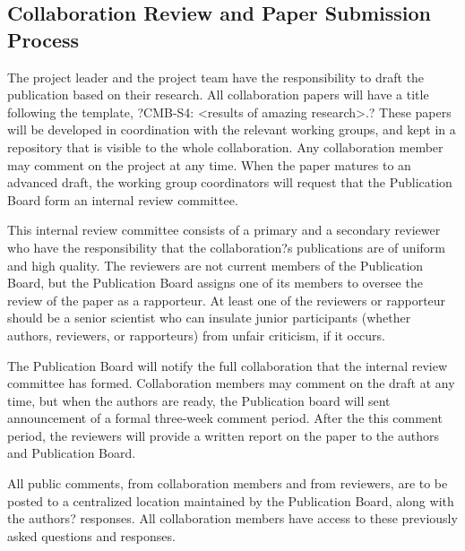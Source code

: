 \subsection{Collaboration Review and Paper Submission Process}
 
The project leader and the project team have the responsibility to draft the publication based on their research.  All collaboration papers will have a title following the template, ?CMB-S4: <results of amazing research>.?  These papers will be developed in coordination with the relevant working groups, and kept in a repository that is visible to the whole collaboration.  Any collaboration member may comment on the project at any time.  When the paper matures to an advanced draft, the working group coordinators will request that the Publication Board form an internal review committee.  

This internal review committee consists of a primary and a secondary reviewer who have the responsibility that the collaboration?s publications are of uniform and high quality.  The reviewers are not current members of the Publication Board, but the Publication Board assigns one of its members to oversee the review of the paper as a rapporteur.  At least one of the reviewers or rapporteur should be a senior scientist who can insulate junior participants (whether authors, reviewers, or rapporteurs) from unfair criticism, if it occurs.

The Publication Board will notify the full collaboration that the internal review committee has formed.  Collaboration members may comment on the draft at any time, but when the authors are ready, the Publication board will sent announcement of a formal three-week comment period.  After the this comment period, the reviewers will provide a written report on the paper to the authors and Publication Board.

All public comments, from collaboration members and from reviewers, are to be posted to a centralized location maintained by the Publication Board, along with the authors? responses.  All collaboration members have access to these previously asked questions and responses.

